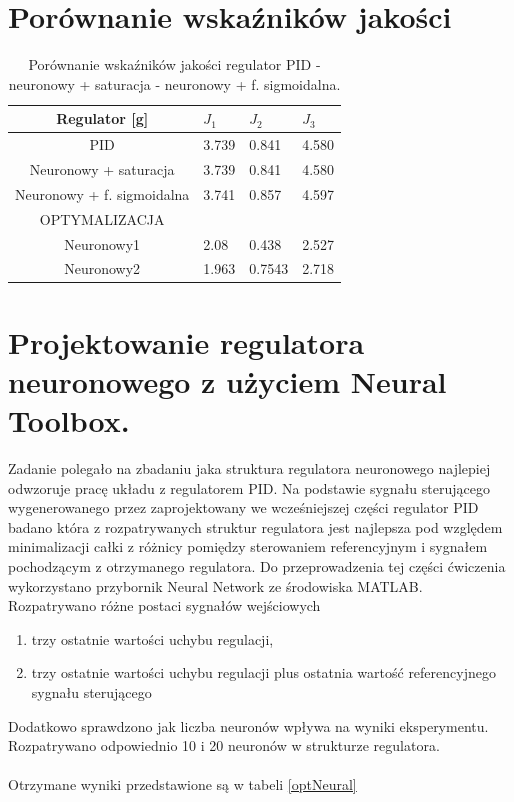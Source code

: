 \FloatBarrier
\newpage
\section{Porównanie wska\'zników jakości}
\begin{table}[h]
	\caption{Porównanie wska\'zników jakości regulator PID - neuronowy + saturacja - neuronowy + f. sigmoidalna.}
	\label{por_reg_pid_n_n}
	\centering
	
	\begin{tabular}{|c|M{2.5cm}|M{2.5cm}|M{2.5cm}|}
		\hline
		Regulator [g]&$J_1$&$J_2$&$J_3$\\
		\hline
		PID &3.739&   0.841 &  4.580\\
		\hline
		Neuronowy + saturacja &3.739 &  0.841 &  4.580\\
		\hline
		Neuronowy + f. sigmoidalna & 3.741 &  0.857 &  4.597\\
		\hline
		OPTYMALIZACJA\\
		\hline
		Neuronowy1 & 2.08 & 0.438 &  2.527\\
		\hline
		Neuronowy2 & 1.963 &  0.7543 &  2.718\\
		\hline
	\end{tabular}
\end{table}
\FloatBarrier

\section{Projektowanie regulatora neuronowego z użyciem Neural Toolbox.}
	
Zadanie polegało na zbadaniu jaka struktura regulatora neuronowego najlepiej odwzoruje pracę układu z regulatorem PID. Na podstawie sygnału sterującego wygenerowanego przez zaprojektowany we wcześniejszej części regulator PID badano która z rozpatrywanych struktur regulatora jest najlepsza pod względem minimalizacji całki z różnicy pomiędzy sterowaniem referencyjnym i sygnałem pochodzącym z otrzymanego regulatora. Do przeprowadzenia tej części ćwiczenia wykorzystano przybornik Neural Network ze środowiska MATLAB. \\

Rozpatrywano różne postaci sygnałów wejściowych 
\begin{enumerate}
	\item trzy ostatnie wartości uchybu regulacji,
	\item trzy ostatnie wartości uchybu regulacji plus ostatnia wartość referencyjnego sygnału sterującego
\end{enumerate} 	
Dodatkowo sprawdzono jak liczba neuronów wpływa na wyniki eksperymentu. Rozpatrywano odpowiednio 10 i 20 neuronów w strukturze regulatora.\\
\\
Otrzymane wyniki przedstawione są w tabeli \ref{optNeural}

